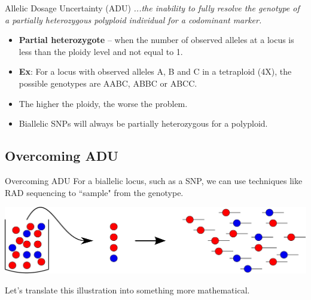 \documentclass[presentation]{beamer}
\begin{document}
\begin{frame}[t]{Allelic Dosage Uncertainty (ADU)}
	\textit{...the inability to fully resolve the genotype of a partially heterozygous polyploid individual for a codominant marker.}
	\vspace{0.1in}
	
	\begin{itemize}
		\item \textbf{Partial heterozygote} -- when the number of observed alleles at a locus is less than the ploidy level and not equal to 1.
		\vspace{0.1in}

		\item \textbf{Ex}: For a locus with observed alleles A, B and C in a tetraploid (4X), the possible genotypes are AABC, ABBC or ABCC.
		\vspace{0.1in}
		
		\item The higher the ploidy, the worse the problem.
		\vspace{0.1in}
		
		\item Biallelic SNPs will always be partially heterozygous for a polyploid.
		
	\end{itemize}
	
\end{frame}

\subsection{Overcoming ADU}

\begin{frame}[t]{Overcoming ADU}
	For a biallelic locus, such as a SNP, we can use techniques like RAD sequencing to ``sample" from the genotype.
	\vspace{0.2in}
	
	\begin{center}
		\includegraphics[width=\textwidth]{fig/pop-gen-model-empty}
	\end{center}
	
	\pause
	\vspace{0.1in}
	Let's translate this illustration into something more mathematical.
\end{frame}
\end{document}
